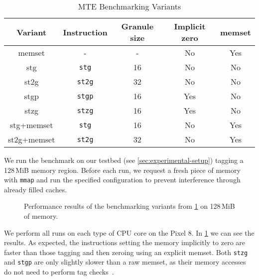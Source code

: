\begin{table}[h]
    \centering
    \small
    \begin{tabular}{c || c | c | c | c }
        \textbf{Variant} & \textbf{Instruction} & \textbf{Granule size} & \textbf{Implicit zero} & \textbf{memset} \\
        \hline
        memset           & -                    & -                     & No                     & Yes             \\
        stg              & \texttt{stg}         & 16                    & No                     & No              \\
        st2g             & \texttt{st2g}        & 32                    & No                     & No              \\
        stgp             & \texttt{stgp}        & 16                    & Yes                    & No              \\
        stzg             & \texttt{stzg}        & 16                    & Yes                    & No              \\
        stg+memset       & \texttt{stg}         & 16                    & No                     & Yes             \\
        st2g+memset      & \texttt{st2g}        & 32                    & No                     & Yes             \\
    \end{tabular}
    \caption{MTE Benchmarking Variants}
    \label{tab:stg-instructions}
\end{table}

We run the benchmark on our testbed (see \cref{sec:experimental-setup}) tagging a 128\,MiB memory region.
Before each run, we request a fresh piece of memory with \texttt{mmap} and run the specified configuration to prevent interference through already filled caches.

\begin{figure}[h]
    \centering
    
    \caption{Performance results of the benchmarking variants from \cref{tab:stg-instructions} on 128\,MiB of memory.}
    \label{fig:stg-performance}
\end{figure}

We perform all runs on each type of CPU core on the Pixel 8.
In \cref{fig:stg-performance} we can see the results.
As expected, the instructions setting the memory implicitly to zero are faster than those tagging and then zeroing using an explicit memset.
Both \texttt{stzg} and \texttt{stgp} are only slightly slower than a raw memset, as their memory accesses do not need to perform tag checks~\cite{ARMA2024Arch64}.

